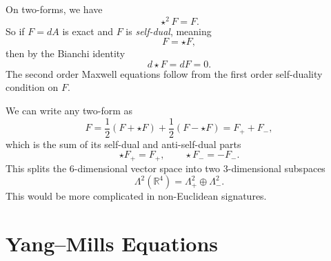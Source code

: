 \begin{example}[self-duality, $n = 4, t = 0$]
  On two-forms, we have
  \begin{equation}
    \star^2 F = F.
  \end{equation}
  So if $F = dA$ is exact and $F$ is \emph{self-dual}, meaning
  \begin{equation}
    \boxed{F = \star F},
  \end{equation}
  then by the Bianchi identity
  \begin{equation}
    d \star F = d F = 0.
  \end{equation}
  The second order Maxwell equations follow from the first order self-duality condition on $F$.
  \begin{remark}
    We can write any two-form as
    \begin{equation}
      F = \frac{1}{2} (F + \star F) + \frac{1}{2} (F - \star F) = F_+ + F_-,
    \end{equation}
    which is the sum of its self-dual and anti-self-dual parts
    \begin{equation}
      \star F_+ = F_+, \qquad \star F_- = - F_-.
    \end{equation}
    This splits the $6$-dimensional vector space into two $3$-dimensional subspaces
    \begin{equation}
      \Lambda^2 (\mathbb{R}^4) = \Lambda_+^2 \oplus \Lambda_-^2.
    \end{equation}
    This would be more complicated in non-Euclidean signatures.
  \end{remark}
\end{example}

\section{Yang--Mills Equations}%
\label{sec:yang_mills_equations}

